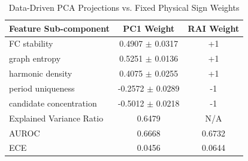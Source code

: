 \begin{table}[htbp]
\centering
\caption{Data-Driven PCA Projections vs. Fixed Physical Sign Weights}
\label{tab:pca_comparison}
\begin{tabular}{lcc}
\hline\hline
Feature Sub-component & PC1 Weight & RAI Weight \\
\hline
FC stability & 0.4907 $\pm$ 0.0317 & +1 \\
graph entropy & 0.5251 $\pm$ 0.0136 & +1 \\
harmonic density & 0.4075 $\pm$ 0.0255 & +1 \\
period uniqueness & -0.2572 $\pm$ 0.0289 & -1 \\
candidate concentration & -0.5012 $\pm$ 0.0218 & -1 \\
\hline
Explained Variance Ratio & 0.6479 & N/A \\
AUROC & 0.6668 & 0.6732 \\
ECE & 0.0456 & 0.0644 \\
\hline
\end{tabular}
\end{table}
